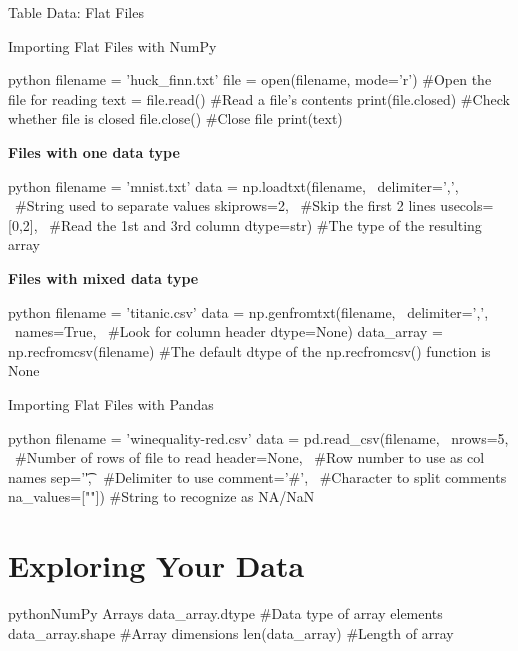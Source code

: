 \begin{myblock}{Table Data: Flat Files}
\begin{myblock}{Importing Flat Files with NumPy}
\begin{codebox}{python}{}
filename = 'huck_finn.txt'
file = open(filename, mode='r')  #Open the file for reading
text = file.read()  #Read a file’s contents
print(file.closed)  #Check whether file is closed
file.close()  #Close file
print(text)
\end{codebox}
\textbf{Files with one data type}
\begin{codebox}{python}{}
filename = 'mnist.txt'
data = np.loadtxt(filename, \
    delimiter=',', \  #String used to separate values
    skiprows=2, \  #Skip the first 2 lines
    usecols=[0,2], \  #Read the 1st and 3rd column
    dtype=str)  #The type of the resulting array
\end{codebox}
\textbf{Files with mixed data type}
\begin{codebox}{python}{}
filename = 'titanic.csv'
data = np.genfromtxt(filename, \
    delimiter=',', \
    names=True, \  #Look for column header
    dtype=None)
data_array = np.recfromcsv(filename)
#The default dtype of the np.recfromcsv() function is None
\end{codebox}
\end{myblock}
\begin{myblock}{Importing Flat Files with Pandas}
\begin{codebox}{python}{}
filename = 'winequality-red.csv'
data = pd.read_csv(filename, \
    nrows=5, \  #Number of rows of file to read
    header=None, \  #Row number to use as col names
    sep='\t', \  #Delimiter to use
    comment='#', \  #Character to split comments
    na_values=[""])  #String to recognize as NA/NaN
\end{codebox}
\end{myblock}
\end{myblock}


\section{Exploring Your Data}

\begin{codebox}{python}{NumPy Arrays}
data_array.dtype  #Data type of array elements
data_array.shape  #Array dimensions
len(data_array)  #Length of array
\end{codebox}

